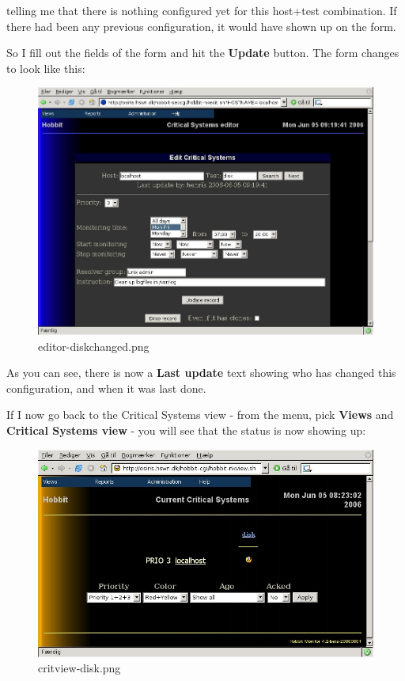  telling me that there is nothing configured yet for this host+test
 combination. If there had been any previous configuration, it would
 have shown up on the form.



 So I fill out the fields of the form and hit the \textbf{Update}
 button. The form changes to look like this: 

\begin{figure}
\centering 
\caption{editor-diskchanged.png}
\label{editor-diskchanged.png}
\includegraphics[scale=0.5]{./editor-diskchanged.png}
\end{figure}

 As you can see, there is now a \textbf{Last update}
 text showing who has changed this configuration, and when it was last done.


 If I now go back to the Critical Systems view - from the menu, pick \textbf{Views}
 and \textbf{Critical Systems view}
 - you will see that the status is now showing up: 

\begin{figure} \centering \caption{critview-disk.png}\label{critview-disk.png}
\includegraphics[scale=0.5]{./critview-disk.png} 
\end{figure}
